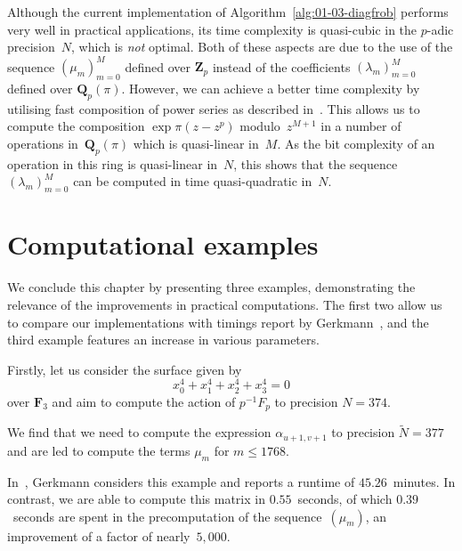 \begin{rem}
Although the current implementation of Algorithm~\ref{alg:01-03-diagfrob} 
performs very well in practical applications, its time complexity is 
quasi-cubic in the $p$-adic precision~$N$, which is \emph{not} optimal.  
Both of these aspects are due to the use of the sequence $(\mu_m)_{m=0}^{M}$ 
defined over $\mathbf{Z}_p$ instead of 
the coefficients $(\lambda_m)_{m=0}^{M}$ defined over $\mathbf{Q}_p(\pi)$. 
However, we can achieve a better time complexity by utilising fast 
composition of power series as described in~\citep[\S 9.3]{Bernstein2008}. 
This allows us to compute the composition $\exp \pi (z - z^p)$ 
modulo~$z^{M+1}$ in a number of operations in~$\mathbf{Q}_p(\pi)$ which 
is quasi-linear in~$M$.  As the bit complexity of an operation in this 
ring is quasi-linear in~$N$, this shows that the sequence 
$(\lambda_m)_{m=0}^{M}$ can be computed in time quasi-quadratic in~$N$.
\end{rem}


\section{Computational examples} 

We conclude this chapter by presenting three examples, demonstrating the 
relevance of the improvements in practical computations.  The first two 
allow us to compare our implementations with timings report by 
Gerkmann~\citep{Gerkmann2007}, and the third example features an increase 
in various parameters.

Firstly, let us consider the surface given by 
\begin{equation*}
x_0^4 + x_1^4 + x_2^4 + x_3^4 = 0
\end{equation*}
over $\mathbf{F}_3$ and aim to compute the action of $p^{-1} F_p$ 
to precision $N = 374$.

We find that we need to compute the expression $\alpha_{u+1,v+1}$ to 
precision $\tilde{N} = 377$ and are led to compute the terms $\mu_m$ for 
$m \leq 1768$.

In~\citep[Section~7.4]{Gerkmann2007}, Gerkmann considers this example 
and reports a runtime of $45.26$~minutes.  In contrast, we are able 
to compute this matrix in $0.55$~seconds, of which $0.39$~seconds are 
spent in the precomputation of the sequence~$(\mu_m)$, an improvement 
of a factor of nearly~$5,000$.

